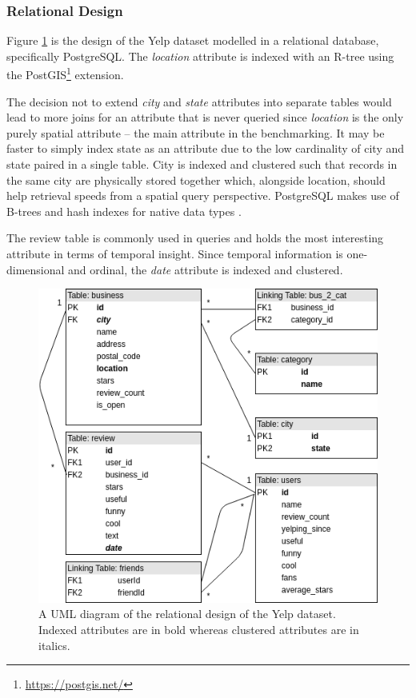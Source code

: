 \subsubsection{Relational Design}
\label{subsub:relational-design}

Figure \ref{fig:relational-design} is the design of the Yelp dataset modelled in a relational database, specifically PostgreSQL. The \emph{location} attribute is indexed with an R-tree using the PostGIS\footnote{\url{https://postgis.net/}} extension. 

The decision not to extend \emph{city} and \emph{state} attributes into separate tables would lead to more joins for an attribute that is never queried since \emph{location} is the only purely spatial attribute -- the main attribute in the benchmarking. It may be faster to simply index state as an attribute due to the low cardinality of city and state paired in a single table. City is indexed and clustered such that records in the same city are physically stored together which, alongside location, should help retrieval speeds from a spatial query perspective. PostgreSQL makes use of B-trees and hash indexes for native data types \cite{post-vs-mysql}.

The review table is commonly used in queries and holds the most interesting attribute in terms of temporal insight. Since temporal information is one-dimensional and ordinal, the \emph{date} attribute is indexed and clustered.

\begin{figure}[h!]
    \centering
    \includegraphics[width=12cm]{img/relational-design.png}
    \caption{A UML diagram of the relational design of the Yelp dataset. Indexed attributes are in bold whereas clustered attributes are in italics.}
    \label{fig:relational-design}
\end{figure}


